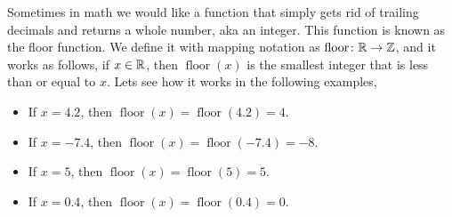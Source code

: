 \documentclass[12pt]{article} %
\begin{document}
\begin{qstn}
  Sometimes in math we would like a function that simply gets rid of trailing decimals and returns a whole number,
  aka an integer. This function is known as the floor function. We define it with mapping notation as $ \operatorname{floor} \colon
  \mathbb R \to \mathbb Z$, and it works as follows, if $x \in \mathbb R$, then $\operatorname{floor}(x)$ is the
  smallest integer that is less than or equal to $x$.
  Lets see how it works in the following examples,
  \begin{itemize}
    \item If $x = 4.2$, then $\operatorname{floor}(x) = \operatorname{floor}(4.2) =  4$.
    \item If $x = -7.4$, then $\operatorname{floor}(x) = \operatorname{floor}(-7.4) = -8$.
    \item If $x = 5$, then $\operatorname{floor}(x) = \operatorname{floor}(5) =  5$.
    \item If $x = 0.4$, then $\operatorname{floor}(x) = \operatorname{floor}(0.4) =  0$.
  \end{itemize}
\end{qstn}
\end{document}
